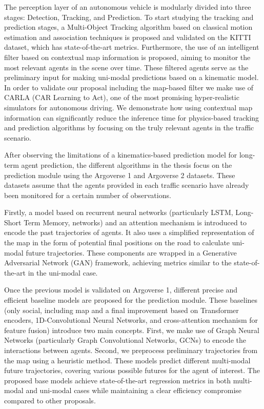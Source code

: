The perception layer of an autonomous vehicle is modularly divided into three stages: Detection, Tracking, and Prediction. To start studying the tracking and prediction stages, a Multi-Object Tracking algorithm based on classical motion estimation and association techniques is proposed and validated on the KITTI dataset, which has state-of-the-art metrics. Furthermore, the use of an intelligent filter based on contextual map information is proposed, aiming to monitor the most relevant agents in the scene over time. These filtered agents serve as the preliminary input for making uni-modal predictions based on a kinematic model. In order to validate our proposal including the map-based filter we make use of CARLA (CAR Learning to Act), one of the most promising hyper-realistic simulators for autonomous driving. We demonstrate how using contextual map information can significantly reduce the inference time for physics-based tracking and prediction algorithms by focusing on the truly relevant agents in the traffic scenario.

After observing the limitations of a kinematics-based prediction model for long-term agent prediction, the different algorithms in the thesis focus on the prediction module using the Argoverse 1 and Argoverse 2 datasets. These datasets assume that the agents provided in each traffic scenario have already been monitored for a certain number of observations.

Firstly, a model based on recurrent neural networks (particularly LSTM, Long-Short Term Memory, networks) and an attention mechanism is introduced to encode the past trajectories of agents. It also uses a simplified representation of the map in the form of potential final positions on the road to calculate uni-modal future trajectories. These components are wrapped in a Generative Adversarial Network (GAN) framework, achieving metrics similar to the state-of-the-art in the uni-modal case.

Once the previous model is validated on Argoverse 1, different precise and efficient baseline models are proposed for the prediction module. These baselines (only social, including map and a final improvement based on Transformer encoders, 1D-Convolutional Neural Networks, and cross-attention mechanism for feature fusion) introduce two main concepts. First, we make use of Graph Neural Networks (particularly Graph Convolutional Networks, GCNs) to encode the interactions between agents. Second, we preprocess preliminary trajectories from the map using a heuristic method. These models predict different multi-modal future trajectories, covering various possible futures for the agent of interest. The proposed base models achieve state-of-the-art regression metrics in both multi-modal and uni-modal cases while maintaining a clear efficiency compromise compared to other proposals.

